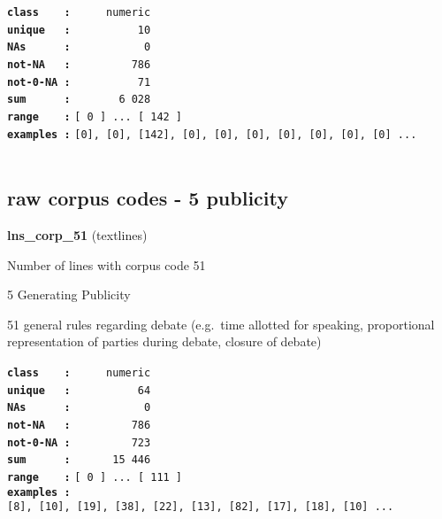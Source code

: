 \documentclass[]{article}
\begin{document}
\textbf{\texttt{class\ \ \ \ :}} \texttt{~~~~~numeric}\\
\textbf{\texttt{unique\ \ \ :}} \texttt{~~~~~~~~~~10}\\
\textbf{\texttt{NAs\ \ \ \ \ \ :}} \texttt{~~~~~~~~~~~0}\\
\textbf{\texttt{not-NA\ \ \ :}} \texttt{~~~~~~~~~786}\\
\textbf{\texttt{not-0-NA\ :}} \texttt{~~~~~~~~~~71}\\
\textbf{\texttt{sum\ \ \ \ \ \ :}} \texttt{~~~~~~~6~028}\\
\textbf{\texttt{range\ \ \ \ :}}
\texttt{{[}\ 0\ {]}\ ...\ {[}\ 142\ {]}}\\
\textbf{\texttt{examples\ :}}
\texttt{{[}0{]},\ {[}0{]},\ {[}142{]},\ {[}0{]},\ {[}0{]},\ {[}0{]},\ {[}0{]},\ {[}0{]},\ {[}0{]},\ {[}0{]}\ ...}\\

~

\subsection{raw corpus codes - 5
publicity}\label{raw-corpus-codes---5-publicity}

\textbf{lns\_corp\_51} (textlines)

Number of lines with corpus code 51

5 Generating Publicity

51 general rules regarding debate (e.g.~time allotted for speaking,
proportional representation of parties during debate, closure of debate)

\textbf{\texttt{class\ \ \ \ :}} \texttt{~~~~~numeric}\\
\textbf{\texttt{unique\ \ \ :}} \texttt{~~~~~~~~~~64}\\
\textbf{\texttt{NAs\ \ \ \ \ \ :}} \texttt{~~~~~~~~~~~0}\\
\textbf{\texttt{not-NA\ \ \ :}} \texttt{~~~~~~~~~786}\\
\textbf{\texttt{not-0-NA\ :}} \texttt{~~~~~~~~~723}\\
\textbf{\texttt{sum\ \ \ \ \ \ :}} \texttt{~~~~~~15~446}\\
\textbf{\texttt{range\ \ \ \ :}}
\texttt{{[}\ 0\ {]}\ ...\ {[}\ 111\ {]}}\\
\textbf{\texttt{examples\ :}}
\texttt{{[}8{]},\ {[}10{]},\ {[}19{]},\ {[}38{]},\ {[}22{]},\ {[}13{]},\ {[}82{]},\ {[}17{]},\ {[}18{]},\ {[}10{]}\ ...}\\

~
\end{document}
